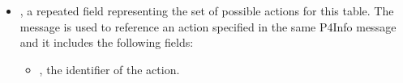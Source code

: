 \documentclass[11pt]{article}
\begin{document}
{\begin{itemize}
\begin{itemize}
\item{}
, which indicates whether the match field has a~; this is useful for
.%
\end{itemize}%

\item{}
, a repeated  field representing the set of possible
actions for this table. The  message is used to reference an action
specified in the same P4Info message and it includes the following fields:%

\begin{itemize}[noitemsep,topsep=\mdcompacttopsep]%

\item{}, the  identifier of the action.%


\end{itemize}
\end{itemize}}
\end{document}
